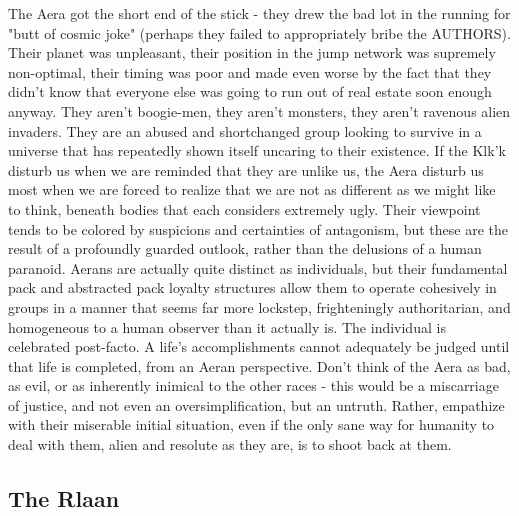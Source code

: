 The Aera got the short end of the stick - they drew the bad lot in the
running for "butt of cosmic joke" (perhaps they failed to
appropriately bribe the AUTHORS). Their planet was unpleasant, their
position in the jump network was supremely non-optimal, their timing
was poor and made even worse by the fact that they didn't know that
everyone else was going to run out of real estate soon enough
anyway. They aren't boogie-men, they aren't monsters, they aren't
ravenous alien invaders. They are an abused and shortchanged group
looking to survive in a universe that has repeatedly shown itself
uncaring to their existence. If the Klk'k disturb us when we are
reminded that they are unlike us, the Aera disturb us most when we are
forced to realize that we are not as different as we might like to
think, beneath bodies that each considers extremely ugly. Their
viewpoint tends to be colored by suspicions and certainties of
antagonism, but these are the result of a profoundly guarded outlook,
rather than the delusions of a human paranoid. Aerans are actually
quite distinct as individuals, but their fundamental pack and
abstracted pack loyalty structures allow them to operate cohesively in
groups in a manner that seems far more lockstep, frighteningly
authoritarian, and homogeneous to a human observer than it actually
is. The individual is celebrated post-facto. A life's accomplishments
cannot adequately be judged until that life is completed, from an
Aeran perspective. Don't think of the Aera as bad, as evil, or as
inherently inimical to the other races - this would be a miscarriage
of justice, and not even an oversimplification, but an
untruth. Rather, empathize with their miserable initial situation,
even if the only sane way for humanity to deal with them, alien and
resolute as they are, is to shoot back at them.

\subsection{The Rlaan}

